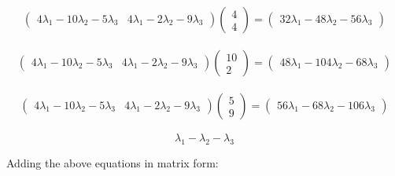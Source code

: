 \documentclass[12pt]{report}
\begin{document}
\begin{equation}
	\begin{aligned}
		\begin{pmatrix}4\lambda_{1}-10\lambda_{2}-5\lambda_{3} & 4\lambda_{1}-2\lambda_{2}-9\lambda_{3}\end{pmatrix}\begin{pmatrix}4 \\ 4\end{pmatrix}=\begin{pmatrix}32\lambda_{1}-48\lambda_{2}-56\lambda_{3}\end{pmatrix}
	\end{aligned}
\end{equation}

\begin{equation}
	\begin{aligned}
		\begin{pmatrix}4\lambda_{1}-10\lambda_{2}-5\lambda_{3} & 4\lambda_{1}-2\lambda_{2}-9\lambda_{3}\end{pmatrix}\begin{pmatrix}10 \\ 2\end{pmatrix}=\begin{pmatrix}48\lambda_{1}-104\lambda_{2}-68\lambda_{3}\end{pmatrix}
	\end{aligned}
\end{equation}

\begin{equation}
	\begin{aligned}             \begin{pmatrix}4\lambda_{1}-10\lambda_{2}-5\lambda_{3}&4\lambda_{1}-2\lambda_{2}-9\lambda_{3}\end{pmatrix}\begin{pmatrix}5\\ 9\end{pmatrix}=\begin{pmatrix}56\lambda_{1}-68\lambda_{2}-106\lambda_{3}\end{pmatrix}
	\end{aligned}
\end{equation}

\begin{equation}
	\lambda_{1}-\lambda_{2}-\lambda_{3}
\end{equation}

Adding the above equations in matrix form:
\end{document}
